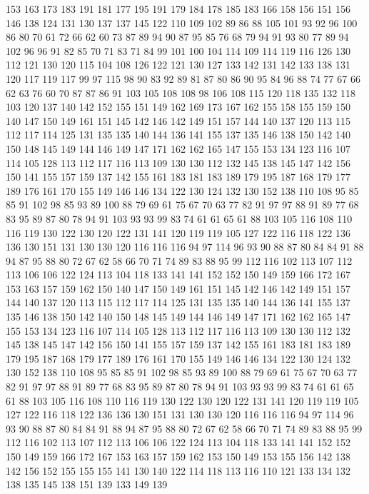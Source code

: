 153 163 173 183 191 181 177 195 191 179 184 178 185 183 166 158 156 151 156 146
138 124 131 130 137 137 145 122 110 109 102 89 86 88 105 101 93 92 96 100
86 80 70 61 72 66 62 60 73 87 89 94 90 87 95 85 76 68 79 94
91 93 80 77 89 94 102 96 96 91 82 85 70 71 83 71 84 99 101 100
104 114 109 114 119 116 126 130 112 121 130 120 115 104 108 126 122 121 130 127
133 142 131 142 133 138 131 120 117 119 117 99 97 115 98 90 83 92 89 81
87 80 86 90 95 84 96 88 74 77 67 66 62 63 76 60 70 87 87 86
91 103 105 108 108 98 106 108 115 120 118 135 132 118 103 120 137 140 142 152
155 151 149 162 169 173 167 162 155 158 155 159 150 140 147 150 149 161 151 145
142 146 142 149 151 157 144 140 137 120 113 115 112 117 114 125 131 135 135 140
144 136 141 155 137 135 146 138 150 142 140 150 148 145 149 144 146 149 147 171
162 162 165 147 155 153 134 123 116 107 114 105 128 113 112 117 116 113 109 130
130 112 132 145 138 145 147 142 156 150 141 155 157 159 137 142 155 161 183 181
183 189 179 195 187 168 179 177 189 176 161 170 155 149 146 146 134 122 130 124
132 130 152 138 110 108 95 85 85 91 102 98 85 93 89 100 88 79 69 61
75 67 70 63 77 82 91 97 97 88 91 89 77 68 83 95 89 87 80 78
94 91 103 93 93 99 83 74 61 61 65 61 88 103 105 116 108 110 116 119
130 122 130 120 122 131 141 120 119 119 105 127 122 116 118 122 136 136 130 151
131 130 130 120 116 116 116 94 97 114 96 93 90 88 87 80 84 84 91 88
94 87 95 88 80 72 67 62 58 66 70 71 74 89 83 88 95 99 112 116
102 113 107 112 113 106 106 122 124 113 104 118 133 141 141 152 152 150 149 159
166 172 167 153 163 157 159 162 150 140 147 150 149 161 151 145 142 146 142 149
151 157 144 140 137 120 113 115 112 117 114 125 131 135 135 140 144 136 141 155
137 135 146 138 150 142 140 150 148 145 149 144 146 149 147 171 162 162 165 147
155 153 134 123 116 107 114 105 128 113 112 117 116 113 109 130 130 112 132 145
138 145 147 142 156 150 141 155 157 159 137 142 155 161 183 181 183 189 179 195
187 168 179 177 189 176 161 170 155 149 146 146 134 122 130 124 132 130 152 138
110 108 95 85 85 91 102 98 85 93 89 100 88 79 69 61 75 67 70 63
77 82 91 97 97 88 91 89 77 68 83 95 89 87 80 78 94 91 103 93
93 99 83 74 61 61 65 61 88 103 105 116 108 110 116 119 130 122 130 120
122 131 141 120 119 119 105 127 122 116 118 122 136 136 130 151 131 130 130 120
116 116 116 94 97 114 96 93 90 88 87 80 84 84 91 88 94 87 95 88
80 72 67 62 58 66 70 71 74 89 83 88 95 99 112 116 102 113 107 112
113 106 106 122 124 113 104 118 133 141 141 152 152 150 149 159 166 172 167 153
163 157 159 162 153 150 149 153 155 156 142 138 142 156 152 155 155 155 141 130
140 122 114 118 113 116 110 121 133 134 132 138 135 145 138 151 139 133 149 139

